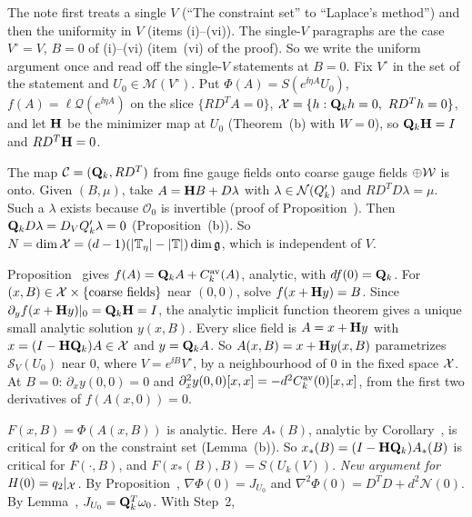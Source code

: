 \begin{detail}\label{d11a:A6}
The note first treats a single $V$ (``The constraint set'' to ``Laplace's method'') and then the uniformity in $V$ (items (i)--(vi)). The single-$V$ paragraphs are the case $V^\circ=V$, $B=0$ of (i)--(vi) (item~(vi) of the proof). So we write the uniform argument once and read off the single-$V$ statements at $B=0$. Fix $V^\circ$ in the set of the statement and $U_0\in\mathscr M(V^\circ)$. Put $\Phi(A)=S(e^{\ii\eta A}U_0)$, $f(A)=\ell\mathcal Q(e^{\ii\eta A})$ on the slice $\{RD^TA=0\}$, $\mathcal X=\{h:\mathbf Q_kh=0,\ RD^Th=0\}$, and let $\mathbf H$ be the minimizer map at $U_0$ (Theorem~(b) with $W=0$), so $\mathbf Q_k\mathbf H=I$ and $RD^T\mathbf H=0$.
\begin{step}[Dimension]
The map $\mathcal C=(\mathbf Q_k,RD^T)$ from fine gauge fields onto coarse gauge fields $\oplus\mathcal W$ is onto. Given $(B,\mu)$, take $A=\mathbf H B+D\lambda$ with $\lambda\in\mathcal N(Q'_k)$ and $RD^TD\lambda=\mu$. Such a $\lambda$ exists because $\mathcal O_0$ is invertible (proof of Proposition~). Then $\mathbf Q_kD\lambda=D_VQ'_k\lambda=0$ (Proposition~(b)). So $N=\dim\mathcal X=(d-1)(|\mathbb T_\eta|-|\mathbb T|)\dim\mathfrak g$, which is independent of $V$.
\end{step}
\begin{step}[(i) Coordinates]
Proposition~ gives $f(A)=\mathbf Q_kA+C^{\rm av}_k(A)$, analytic, with $df(0)=\mathbf Q_k$. For $(x,B)\in\mathcal X\times\{\text{coarse fields}\}$ near $(0,0)$, solve $f(x+\mathbf H y)=B$. Since $\partial_yf(x+\mathbf H y)|_0=\mathbf Q_k\mathbf H=I$, the analytic implicit function theorem gives a unique small analytic solution $y(x,B)$. Every slice field is $A=x+\mathbf H y$ with $x=(I-\mathbf H\mathbf Q_k)A\in\mathcal X$ and $y=\mathbf Q_kA$. So $A(x,B)=x+\mathbf H y(x,B)$ parametrizes $\mathcal S_V(U_0)$ near $0$, where $V=e^{\ii B}V^\circ$, by a neighbourhood of $0$ in the fixed space $\mathcal X$. At $B=0$: $\partial_xy(0,0)=0$ and $\partial_x^2y(0,0)[x,x]=-d^2C^{\rm av}_k(0)[x,x]$, from the first two derivatives of $f(A(x,0))=0$.
\end{step}
\begin{step}
$F(x,B)=\Phi(A(x,B))$ is analytic. Here $A_*(B)$, analytic by Corollary~, is critical for $\Phi$ on the constraint set (Lemma~(b)). So $x_*(B)=(I-\mathbf H\mathbf Q_k)A_*(B)$ is critical for $F(\cdot,B)$, and $F(x_*(B),B)=S(U_k(V))$. \emph{New argument for $H(0)=q_2|_\mathcal X$.} By Proposition~, $\nabla\Phi(0)=J_{U_0}$ and $\nabla^2\Phi(0)=D^TD+d^2\mathcal N(0)$. By Lemma~, $J_{U_0}=\mathbf Q_k^T\omega_0$. With Step~2,

\end{step}
\end{detail}
